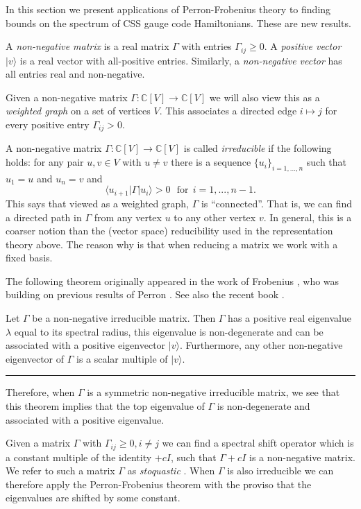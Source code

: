 \documentclass[11pt,oneside]{article}
\def\Complex{\mathbb{C}}
\newcommand{\ket}[1]{|{#1}\rangle}
\newcommand{\bra}[1]{\langle{#1}|}
\newcommand\dotheorem[1]{\vskip 5pt \noindent {\bf \underline{Theorem #1.}\ }}
\newcommand\tombstone{\rule{.36em}{2ex}\vskip 5pt}
\begin{document}
In this section we present 
applications of Perron-Frobenius theory to finding bounds on the spectrum of
CSS gauge code Hamiltonians. These are new results.

A \emph{non-negative matrix} is a real matrix
$\Gamma$ with entries $\Gamma_{ij}\ge 0.$
A \emph{positive vector} $\ket{v}$ is a real vector 
with all-positive entries. Similarly, a \emph{non-negative vector}
has all entries real and non-negative.

Given a non-negative matrix 
$\Gamma : \Complex[V] \to \Complex[V]$
we will also view this as a \emph{weighted graph} on a set of vertices $V.$
This associates a directed edge $i\mapsto j$ for every positive
entry $\Gamma_{ij}>0.$

A non-negative matrix 
$\Gamma : \Complex[V] \to \Complex[V]$
is called \emph{irreducible} if the following holds:
for any pair $u, v\in V$ with $u\ne v$ there is
a sequence $\{u_i \}_{i=1,...,n}$ such that $u_1=u$
and $u_n=v$ and
$$
    \bra{u_{i+1}}\Gamma\ket{u_i} > 0\ \ \ \mbox{for}\ \ i=1,...,n-1.
$$
This says that viewed as a weighted graph, $\Gamma$ is ``connected''.
That is, we can find a directed path in $\Gamma$
from any vertex $u$ to any other vertex $v$.
In general, this is a coarser notion than
the (vector space) reducibility used in the representation theory above.
The reason why is that when reducing a matrix we work
with a fixed basis.

The following theorem originally appeared
in the work of Frobenius \cite{Frobenius1912}, who
was building on previous results of Perron \cite{Perron1907}.
See also the recent book \cite{Baez2012}.

\dotheorem{(Perron-Frobenius)}
Let $\Gamma$ be a non-negative irreducible matrix.
Then $\Gamma$ has a positive real eigenvalue
$\lambda$ equal to its spectral radius,
this eigenvalue is non-degenerate and can be associated 
with a positive eigenvector $\ket{v}$.
Furthermore, any other non-negative eigenvector of 
$\Gamma$ is a scalar multiple of $\ket{v}.$
\tombstone

Therefore, when $\Gamma$ is a symmetric non-negative irreducible matrix,
we see that this theorem implies that the top eigenvalue of $\Gamma$ is
non-degenerate and associated with a positive eigenvalue.

Given a matrix $\Gamma$ with $\Gamma_{ij}\ge 0, i\ne j$ we can
find a spectral shift operator which is a constant multiple of the identity $+cI$,
such that $\Gamma+cI$ is a non-negative matrix. 
We refer to such a matrix $\Gamma$ as \emph{stoquastic} \cite{Bravyi2008,Bravyi2015}.
When $\Gamma$ is also irreducible we can therefore apply the Perron-Frobenius
theorem with the proviso that the eigenvalues are shifted by some constant.
\end{document}

